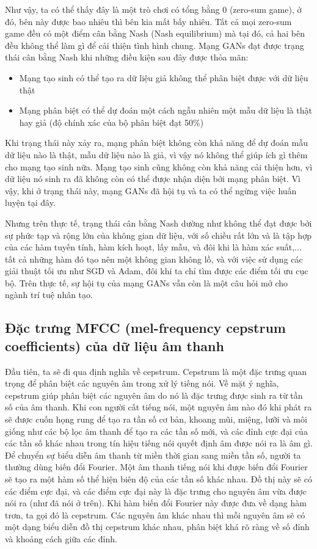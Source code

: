 Như vậy, ta có thể thấy đây là một trò chơi có tổng bằng 0 (zero-sum game), ở đó, bên này được bao nhiêu thì bên kia mất bấy nhiêu. Tất cả mọi zero-sum game đều có một điểm cân bằng Nash (Nash equilibrium) mà tại đó, cả hai bên đều không thể làm gì để cải thiện tình hình chung. Mạng GANs đạt được trạng thái cân bằng Nash khi những điều kiện sau đây được thỏa mãn:
\begin{itemize}
    \item Mạng tạo sinh có thể tạo ra dữ liệu giả không thể phân biệt được với dữ liệu thật
    \item Mạng phân biệt có thể dự đoán một cách ngẫu nhiên một mẫu dữ liệu là thật hay giả (độ chính xác của bộ phân biệt đạt 50\%)
\end{itemize}
Khi trạng thái này xảy ra, mạng phân biệt không còn khả năng để dự đoán mẫu dữ liệu nào là thật, mẫu dữ liệu nào là giả, vì vậy nó không thể giúp ích gì thêm cho mạng tạo sinh nữa. Mạng tạo sinh cũng không còn khả năng cải thiện hơn, vì dữ liệu nó sinh ra đã không còn có thể được nhận diện bởi mạng phân biệt. Vì vậy, khi ở trạng thái này, mạng GANs đã hội tụ và ta có thể ngừng việc huấn luyện tại đây.

Nhưng trên thực tế, trạng thái cân bằng Nash dường như không thể đạt được bởi sự phức tạp và rộng lớn của không gian dữ liệu, với số chiều rất lớn và là tập hợp của các hàm tuyến tính, hàm kích hoạt, lấy mẫu, và đôi khi là hàm xác suất,... tất cả những hàm đó tạo nên một không gian không lồ, và với việc sử dụng các giải thuật tối ưu như SGD và Adam, đôi khi ta chỉ tìm được các điểm tối ưu cục bộ. Trên thực tế, sự hội tụ của mạng GANs vẫn còn là một câu hỏi mở cho ngành trí tuệ nhân tạo.

\subsection{\texorpdfstring{Đặc trưng MFCC (mel-frequency cepstrum coefficients) của dữ liệu âm thanh}{mfcc}}\label{sec:base_knowledge_mfcc}

Đầu tiên, ta sẽ đi qua định nghĩa về cepstrum. Cepstrum là một đặc trưng quan trọng để phân biệt các nguyên âm trong xử lý tiếng nói. Về mặt ý nghĩa, cepstrum giúp phân biệt các nguyên âm do nó là đặc trưng được sinh ra từ tần số của âm thanh. Khi con người cất tiếng nói, một nguyên âm nào đó khi phát ra sẽ được cuốn họng rung để tạo ra tần số cơ bản, khoang mũi, miệng, lưỡi và môi giống như các bộ lọc âm thanh để tạo ra các tần số mới, và các đỉnh cực đại của các tần số khác nhau trong tín hiệu tiếng nói quyết định âm được nói ra là âm gì. Để chuyển sự biểu diễn âm thanh từ miền thời gian sang miền tần số, người ta thường dùng biến đổi Fourier. Một âm thanh tiếng nói khi được biến đổi Fourier sẽ tạo ra một hàm số thể hiện biên độ của các tần số khác nhau. Đồ thị này sẽ có các điểm cực đại, và các điểm cực đại này là đặc trưng cho nguyên âm vừa được nói ra (như đã nói ở trên). Khi hàm biến đổi Fourier này được đưa về dạng hàm trơn, ta gọi đó là cepstrum. Các nguyên âm khác nhau thì mỗi nguyên âm sẽ có một dạng biểu diễn đồ thị cepstrum khác nhau, phân biệt khá rõ ràng về số đỉnh và khoảng cách giữa các đỉnh.

